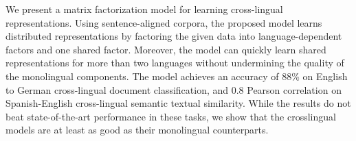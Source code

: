 We present a matrix factorization model for learning cross-lingual representations. Using sentence-aligned corpora, the proposed model learns distributed representations by factoring the given data into language-dependent factors and one shared factor. Moreover, the model can quickly learn shared representations for more than two languages without undermining the quality of the monolingual components. The model achieves an accuracy of 88\%  on English to German cross-lingual document classification, and 0.8 Pearson correlation on Spanish-English cross-lingual semantic textual similarity. While the results do not beat state-of-the-art performance in these tasks, we show that the crosslingual models are at least as good as their monolingual counterparts.
